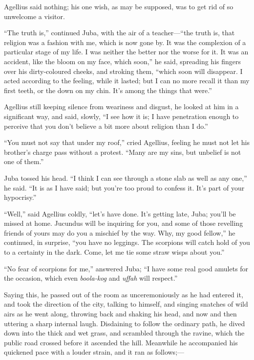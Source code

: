 Agellius said nothing; his one wish, as may be supposed, was to get
rid of so unwelcome a visitor.

``The truth is,'' continued Juba, with the air of a teacher—``the
truth is, that religion was a fashion with me, which is now gone by.
It was the complexion of a particular stage of my life. I was neither
the better nor the worse for it. It was an accident, like the bloom on
my face, which soon,'' he said, spreading his fingers over his
dirty-coloured cheeks, and stroking them, ``which soon will
disappear. I acted according to the feeling, while it lasted; but I
can no more recall it than my first teeth, or the down on my chin. It's
among the things that were.''

Agellius still keeping silence from weariness and disgust, he
looked at him in a significant way, and said, slowly, ``I see how
it is; I have penetration enough to perceive that you don't believe a
bit more about religion than I do.''

``You must not say that under my roof,'' cried Agellius,
feeling he must not let his brother's charge pass without a protest.
``Many are my sins, but unbelief is not one of them.''

Juba tossed his head. ``I think I can see through a stone slab
as well as any one,'' he said. ``It is as I have said;
but you're too proud to confess it. It's part of your hypocrisy.''

``Well,'' said Agellius coldly, ``let's have done. It's
getting late, Juba; you'll be missed at home. Jucundus will be
inquiring for you, and some of those revelling friends of yours may do
you a mischief by the way. Why, my good fellow,'' he continued, in
surprise, ``you have no leggings. The scorpions will catch hold of
you to a certainty in the dark. Come, let me tie some straw wisps
about you.''

``No fear of scorpions for me,'' answered Juba; ``I
have some real good amulets for the occasion, which even \emph{boola-kog}
and \emph{uffah} will respect.''

Saying this, he passed out of the room as unceremoniously as he had
entered it, and took the direction of the city, talking to himself,
and singing snatches of wild airs as he went along, throwing back and
shaking his head, and now and then uttering a sharp internal laugh.
Disdaining to follow the ordinary path, he dived down into the thick
and wet grass, and scrambled through the ravine, which the public road
crossed before it ascended the hill. Meanwhile he accompanied his
quickened pace with a louder strain, and it ran as follows;—

